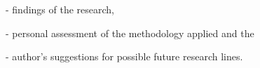 - findings of the research,

- personal assessment of the methodology applied and the 

- author's suggestions for possible future research lines.
